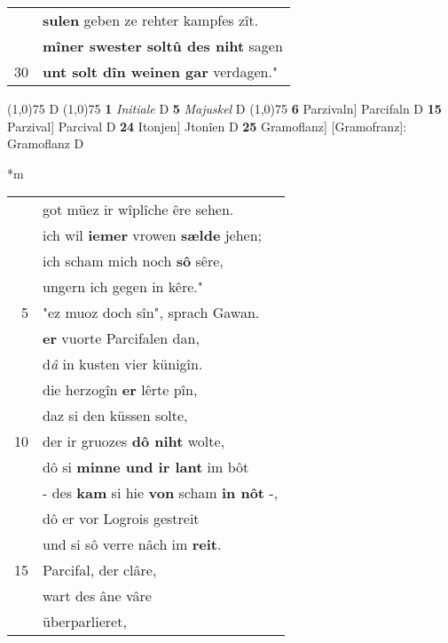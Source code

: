 \documentclass[8pt,a4paper,notitlepage]{article}
\begin{document}
\begin{table}[ht]
\begin{minipage}[t]{0.5\linewidth}
\begin{tabular}{rl}
 & \textbf{sulen} geben ze rehter kampfes zît.\\ 
 & \textbf{mîner swester soltû des niht} sagen\\ 
30 & \textbf{unt solt dîn weinen gar} verdagen."\\ 
\end{tabular}
\scriptsize
\line(1,0){75} \newline
D \newline
\line(1,0){75} \newline
\textbf{1} \textit{Initiale} D  \textbf{5} \textit{Majuskel} D  \newline
\line(1,0){75} \newline
\textbf{6} Parzivaln] Parcifaln D \textbf{15} Parzival] Parcival D \textbf{24} Itonjen] Jtonîen D \textbf{25} Gramoflanz] [Gramofranz]: Gramoflanz D \newline
\end{minipage}
\hspace{0.5cm}
\begin{minipage}[t]{0.5\linewidth}
\small
\begin{center}*m
\end{center}
\begin{tabular}{rl}
 & got müez ir wîplîche êre sehen.\\ 
 & ich wil \textbf{iemer} vrowen \textbf{sælde} jehen;\\ 
 & ich scham mich noch \textbf{sô} sêre,\\ 
 & ungern ich gegen in kêre."\\ 
5 & "ez muoz doch sîn", sprach Gawan.\\ 
 & \textbf{er} vuorte Parcifalen dan,\\ 
 & d\textit{â} in kusten vier künigîn.\\ 
 & die herzogîn \textbf{er} lêrte pîn,\\ 
 & daz si den küssen solte,\\ 
10 & der ir gruozes \textbf{dô niht} wolte,\\ 
 & dô si \textbf{minne und ir lant} im bôt\\ 
 & - des \textbf{kam} si hie \textbf{von} scham \textbf{in nôt} -,\\ 
 & dô er vor Logrois gestreit\\ 
 & und si sô verre nâch im \textbf{reit}.\\ 
15 & Parcifal, der clâre,\\ 
 & wart des âne vâre\\ 
 & überparlieret,\\ 

\end{tabular}
\end{minipage}
\end{table}
\end{document}
